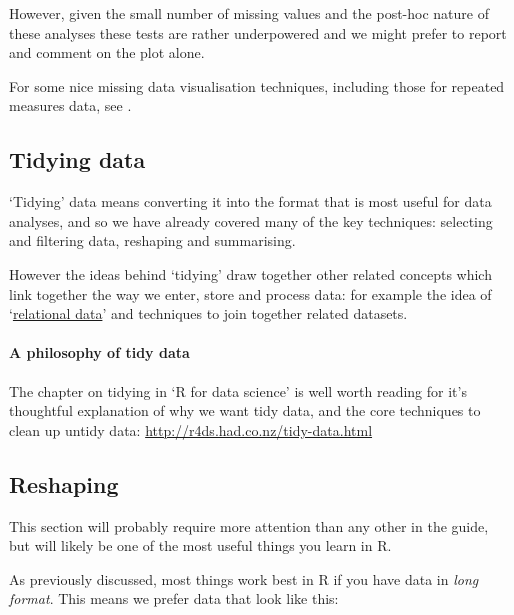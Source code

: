 \documentclass[]{article}
\let\oldparagraph\paragraph
\renewcommand{\paragraph}[1]{\oldparagraph{#1}\mbox{}}
\theoremstyle{definition}
\theoremstyle{definition}
\theoremstyle{definition}
\theoremstyle{remark}
\begin{document}
However, given the small number of missing values and the post-hoc
nature of these analyses these tests are rather underpowered and we
might prefer to report and comment on the plot alone.

For some nice missing data visualisation techniques, including those for
repeated measures data, see \citet{zhang2015missing}.

\hypertarget{tidying-data}{\subsection*{Tidying
data}\label{tidying-data}}

`Tidying' data means converting it into the format that is most useful
for data analyses, and so we have already covered many of the key
techniques: selecting and filtering data, reshaping and summarising.

However the ideas behind `tidying' draw together other related concepts
which link together the way we enter, store and process data: for
example the idea of `\href{}{relational data}' and techniques to join
together related datasets.

\paragraph{A philosophy of tidy data}\label{a-philosophy-of-tidy-data}

The chapter on tidying in `R for data science' is well worth reading for
it's thoughtful explanation of why we want tidy data, and the core
techniques to clean up untidy data:
\url{http://r4ds.had.co.nz/tidy-data.html}

\hypertarget{reshaping}{\subsection*{Reshaping}\label{reshaping}}

This section will probably require more attention than any other in the
guide, but will likely be one of the most useful things you learn in R.

As previously discussed, most things work best in R if you have data in
\emph{long format}. This means we prefer data that look like this:
\end{document}
